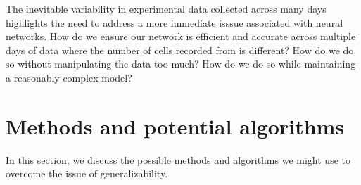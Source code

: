 \documentclass[12pt]{article}
\begin{document}
The inevitable variability in experimental data collected across many days highlights  the need to address a more immediate isssue associated with neural networks.
How do we ensure our network is efficient and accurate across multiple days of data where the number of cells recorded from is different? How do we do so without manipulating the data too much? How do we do so while maintaining a reasonably complex model?
\section{Methods and potential algorithms}
In this section, we discuss the possible methods and algorithms we might use to overcome the issue of generalizability.
\end{document}
